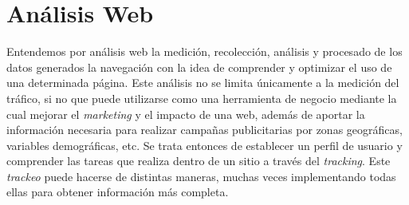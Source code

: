 \documentclass[12pt,a4paper,oneside]{book} %
\begin{document}
\section{Análisis Web}
Entendemos por análisis web la medición, recolección, análisis y procesado de los datos generados  la  navegación  con la idea de comprender y optimizar el uso de una determinada página. 
\newline \newline
Este análisis no se limita únicamente a la medición del tráfico, si no que puede utilizarse como una herramienta de negocio mediante la cual mejorar el \textit{marketing} y el impacto de una web, además de aportar la información necesaria para realizar campañas publicitarias por zonas geográficas, variables demográficas, etc. Se trata entonces de establecer un perfil de usuario y comprender las tareas que realiza dentro de un sitio a través del \textit{tracking}. Este \textit{trackeo} puede hacerse de distintas maneras, muchas veces implementando todas ellas para obtener información más completa.
\end{document}
